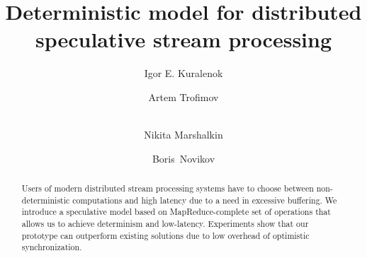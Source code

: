 \documentclass{llncs}
\begin{document}
\title {Deterministic model for distributed speculative stream processing}
\author{Igor E. Kuralenok
       \and Artem Trofimov
       \and \\Nikita Marshalkin
      \and Boris~Novikov}

\maketitle

\begin{abstract}
Users of modern distributed stream processing systems have to choose between non-deterministic computations and high latency due to a need in excessive buffering. 
We introduce a speculative model based on MapReduce-complete set of operations that allows us to achieve determinism and low-latency.
Experiments show that our prototype can outperform existing solutions due to low overhead of optimistic synchronization.


\end {abstract}
\end{document}
